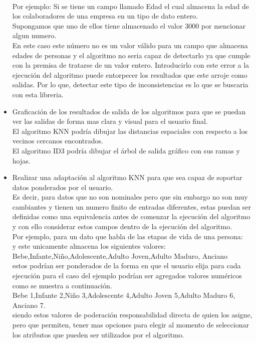 \begin{itemize}
	\\
	Por ejemplo: Si se tiene un campo llamado Edad el cual almacena la edad de los colaboradores de una empresa en un tipo de dato entero.\\
	Supongamos que uno de ellos tiene almacenado el valor 3000 por mencionar algun numero.\\
	En este caso este número no es un valor válido para un campo que almacena edades de personas y el algoritmo no seria capaz de detectarlo ya que cumple con la premisa de tratarse de un valor entero. Introducirlo con este error a la ejecución del algoritmo puede entorpecer los resultados que este arroje como salidas. Por lo que, detectar este tipo de inconsistencias es lo que se buscaria con esta libreria.\\
	\item Graficación de los resultados de salida de los algoritmos para que se puedan ver las salidas de forma mas clara y visual para el usuario final.\\
	El algoritmo KNN podría dibujar las distancias espaciales con respecto a los vecinos cercanos encontrados.\\
	El algoritmo ID3 podría dibujar el árbol de salida gráfico con sus ramas y hojas.\\
	\item Realizar una adaptación al algoritmo KNN para que sea capaz de soportar datos ponderados por el usuario. \\
	Es decir, para datos que no son nominales pero que sin embargo no son muy cambiantes y tienen un numero finito de entradas diferentes, estas puedan ser definidas como una equivalencia antes de comenzar la ejecución del algoritmo y con ello considerar estos campos dentro de la ejecución del algoritmo.\\
	Por ejemplo, para un dato que habla de las etapas de vida de una persona: \\
	y este unicamente almacena los siguientes valores: 
	Bebe,Infante,Niño,Adolescente,Adulto Joven,Adulto Maduro, Anciano\\
	estos podrían ser ponderados de la forma en que el usuario elija para cada ejecución para el caso del ejemplo podrían ser agregados valores numéricos como se muestra a continuación.\\
	Bebe 1,Infante 2,Niño 3,Adolescente 4,Adulto Joven 5,Adulto Maduro 6, Anciano 7.\\
	siendo estos valores de poderación responsabilidad directa de quien los asigne, pero que permiten, tener mas opciones para elegir al momento de seleccionar los atributos que pueden ser utilizados por el algoritmo.\\

\end{itemize}
